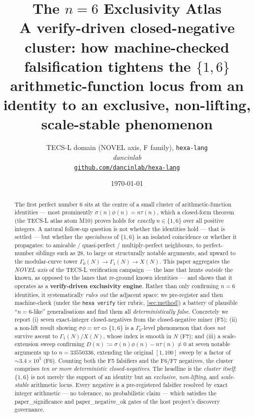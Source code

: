 \documentclass[11pt,a4paper]{article}
\title{
  \textbf{The \texorpdfstring{$n=6$}{n=6} Exclusivity Atlas}\\[4pt]
  \large A verify-driven closed-negative cluster: how machine-checked
  falsification tightens the \texorpdfstring{$\{1,6\}$}{\{1,6\}} arithmetic-function
  locus from an identity to an exclusive, non-lifting, scale-stable phenomenon
}
\author{
  TECS-L domain (NOVEL axis, F family), \texttt{hexa-lang}\\
  \normalsize\textit{dancinlab}\\[2pt]
  \normalsize\href{https://github.com/dancinlab/hexa-lang}{\texttt{github.com/dancinlab/hexa-lang}}
}
\date{\today}
\newcommand{\sig}{\sigma}
\newcommand{\Dn}{D(n)}
\theoremstyle{definition}
\begin{document}
\maketitle

\begin{abstract}
The first perfect number $6$ sits at the centre of a small cluster of
arithmetic-function identities --- most prominently
$\sig(n)\phi(n)=n\tau(n)$, which a closed-form theorem (the TECS-L atlas atom
\textsf{M10}) proves holds for \emph{exactly} $n\in\{1,6\}$ over all positive
integers. A natural follow-up question is not whether the identities hold ---
that is settled --- but whether the \emph{specialness} of $\{1,6\}$ is an
isolated coincidence or whether it propagates: to amicable / quasi-perfect /
multiply-perfect neighbours, to perfect-number siblings such as $28$, to large
or structurally notable arguments, and upward to the modular-curve tower
$\Gamma_0(N)\to\Gamma_1(N)\to X(N)$. This paper aggregates the
\emph{NOVEL axis} of the TECS-L verification campaign --- the lane that hunts
\emph{outside} the known, as opposed to the lanes that re-ground known
identities --- and shows that it operates as a \textbf{verify-driven
exclusivity engine}. Rather than only confirming $n=6$ identities, it
systematically \emph{rules out} the adjacent space: we pre-register and then
machine-check (under the \texttt{hexa verify} tier rubric,
\textsection\ref{sec:method}) a battery of plausible ``$n=6$-like''
generalisations and find them all \emph{deterministically false}. Concretely we
report (i) seven exact-integer closed-negatives from the closed-negative miner
(\textsf{F5}); (ii) a non-lift result showing $\sig\phi=n\tau\Leftrightarrow\{1,6\}$
is a $\Gamma_0$-level phenomenon that does \emph{not} survive ascent to
$\Gamma_1(N)/X(N)$, whose index is smooth in $N$ (\textsf{F7}); and (iii) a
scale-extension sweep confirming $\Dn:=\sig(n)\phi(n)-n\tau(n)\neq0$ at seven
notable arguments up to $n=33550336$, extending the original $[1,100]$ sweep by
a factor of $\sim\!3.4\times10^{5}$ (\textsf{F6}). Counting both the F5
falsifiers and the F6/F7 negatives, the cluster comprises
\emph{ten or more deterministic closed-negatives}. The headline is the
\emph{cluster itself}: $\{1,6\}$ is not merely the support of an identity but an
\emph{exclusive}, \emph{non-lifting}, and \emph{scale-stable} arithmetic
locus. Every negative is a pre-registered falsifier resolved by exact integer
arithmetic --- no tolerance, no probabilistic claim --- which satisfies the
\textsf{paper\_significance} and \textsf{paper\_negative\_ok} gates of the host
project's discovery governance.
\end{abstract}
\end{document}
